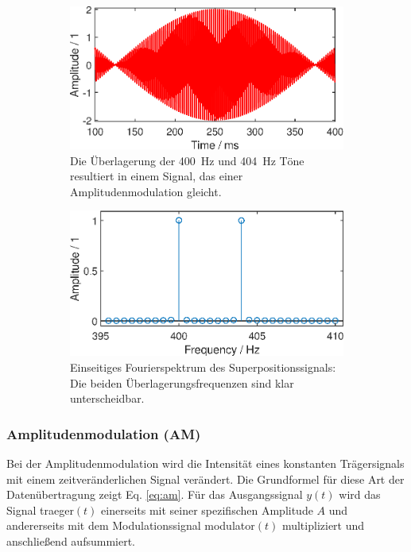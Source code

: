 \begin{figure}[h]
\begin{subfigure}{.49\textwidth} 
  \centering
  \includegraphics[width=\linewidth]{ue4/signaladdition.eps} %
  \caption{Die Überlagerung der \SI{400}{\Hz} und \SI{404}{\Hz} Töne resultiert in einem Signal, das einer Amplitudenmodulation gleicht.}
  \label{fig:signal_addition}
\end{subfigure}%
\hfill
\begin{subfigure}{.49\textwidth} 
  \centering
  \includegraphics[width=\linewidth]{ue4/signaladdition_spectrum.eps} %
  \caption{Einseitiges Fourierspektrum des Superpositionssignals: Die beiden Überlagerungsfrequenzen sind klar unterscheidbar.}
  \label{fig:signal_fft}
\end{subfigure}
\caption{}
\label{fig:signal_super}
\end{figure}

\clearpage

\subsubsection{Amplitudenmodulation (AM)}
Bei der Amplitudenmodulation wird die Intensität eines konstanten Trägersignals mit einem zeitveränderlichen Signal verändert. Die Grundformel für diese Art der Datenübertragung zeigt Eq. \ref{eq:am}. Für das Ausgangssignal $y(t)$ wird das Signal traeger$(t)$ einerseits mit seiner spezifischen Amplitude $A$ und andererseits mit dem Modulationssignal modulator$(t)$ multipliziert und anschließend aufsummiert. 



